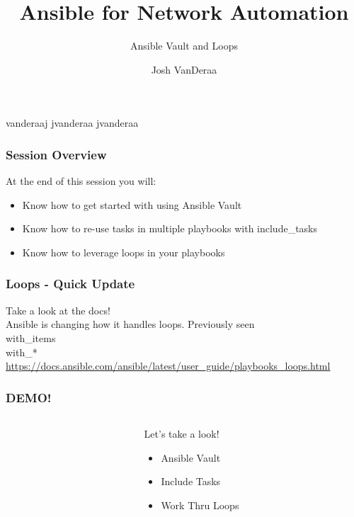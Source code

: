 \documentclass[aspectratio=169]{beamer}
\title{Ansible for Network Automation}
\subtitle{Ansible Vault and Loops}
\date{}
\author{Josh VanDeraa}
\begin{document}
\begin{frame}
  \maketitle
  \footnotesize
  \faTwitter vanderaaj \hfill \faGithub jvanderaa \hfill \faSlack jvanderaa
\end{frame}

\begin{frame}
  \frametitle{Session Overview}
  At the end of this session you will:
  \begin{itemize}
    \item <2-> Know how to get started with using Ansible Vault
    \item <3-> Know how to re-use tasks in multiple playbooks with include\_tasks
    \item <4-> Know how to leverage loops in your playbooks
  \end{itemize}
\end{frame}

\begin{frame}
  \frametitle{Loops - Quick Update}
  \begin{center}
    \Huge Take a look at the docs!\\
    \normalsize
    Ansible is changing how it handles loops. Previously seen\\
      with\_items\\
      with\_*\\
    \url{https://docs.ansible.com/ansible/latest/user_guide/playbooks_loops.html}
  \end{center}
\end{frame}
  
\begin{frame}
  \frametitle{DEMO!}
  \begin{columns}
  \begin{column}{0.3\textwidth}
    \Huge
    \begin{center}
      \faDesktop 
      \hspace{.5cm}
      \faRocket     
    \end{center}
  \end{column}
  \begin{column}{0.7\textwidth}
    \huge 
      Let's take a look!
      \begin{itemize}
        \item Ansible Vault
        \item Include Tasks
        \item Work Thru Loops
      \end{itemize}
  \end{column}
  \end{columns}
\end{frame}
\end{document}
